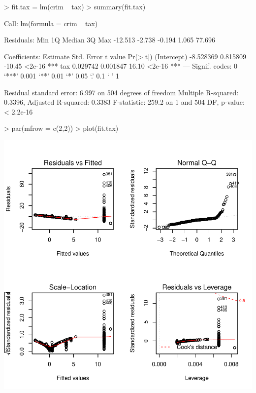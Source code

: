 \documentclass[a4paper]{article}
\begin{document}
\begin{Schunk}
\begin{Sinput}
> fit.tax = lm(crim ~ tax)
> summary(fit.tax)
\end{Sinput}
\begin{Soutput}
Call:
lm(formula = crim ~ tax)

Residuals:
    Min      1Q  Median      3Q     Max 
-12.513  -2.738  -0.194   1.065  77.696 

Coefficients:
             Estimate Std. Error t value Pr(>|t|)    
(Intercept) -8.528369   0.815809  -10.45   <2e-16 ***
tax          0.029742   0.001847   16.10   <2e-16 ***
---
Signif. codes:  0 ‘***’ 0.001 ‘**’ 0.01 ‘*’ 0.05 ‘.’ 0.1 ‘ ’ 1

Residual standard error: 6.997 on 504 degrees of freedom
Multiple R-squared:  0.3396,	Adjusted R-squared:  0.3383 
F-statistic: 259.2 on 1 and 504 DF,  p-value: < 2.2e-16
\end{Soutput}
\begin{Sinput}
> par(mfrow = c(2,2))
> plot(fit.tax)
\end{Sinput}
\end{Schunk}
\includegraphics{mutivariblelm-tax}
\end{document}
